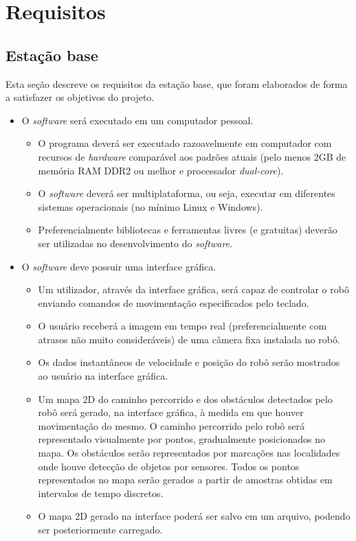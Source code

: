\section{Requisitos}


\subsection{Estação base}
%
Esta seção descreve os requisitos da estação base, que foram elaborados de forma a satisfazer os objetivos do projeto.

\begin{itemize} %

  \item O \textit{software} será executado em um computador pessoal.
    \begin{itemize}
      \item O programa deverá ser executado razoavelmente em computador com recursos de \textit{hardware} comparável aos padrões atuais (pelo menos 2GB de memória RAM DDR2 ou melhor e processador \textit{dual-core}).
      \item O \textit{software} deverá ser multiplataforma, ou seja, executar em diferentes sistemas operacionais (no mínimo Linux e Windows).
      \item Preferencialmente bibliotecas e ferramentas livres (e gratuitas) deverão ser utilizadas no desenvolvimento do \textit{software}.
    \end{itemize}

  \item O \textit{software} deve possuir uma interface gráfica.
    \begin{itemize}
      \item Um utilizador, através da interface gráfica, será capaz de controlar o robô enviando comandos de movimentação especificados pelo teclado. 
      \item O usuário receberá a imagem em tempo real (preferencialmente com atrasos não muito consideráveis) de uma câmera fixa instalada no robô. 
      \item Os dados instantâneos de velocidade e posição do robô serão mostrados ao usuário na interface gráfica.
      \item Um mapa 2D do caminho percorrido e dos obstáculos detectados pelo robô será gerado, na interface gráfica, à medida em que houver movimentação do mesmo. O caminho percorrido pelo robô será representado visualmente por pontos, gradualmente posicionados no mapa. Os obstáculos serão representados por marcações nas localidades onde houve detecção de objetos por sensores. Todos os pontos representados no mapa serão gerados a partir de amostras obtidas em intervalos de tempo discretos.
      \item O mapa 2D gerado na interface poderá ser salvo em um arquivo, podendo ser posteriormente carregado.
    \end{itemize}

\end{itemize} %



